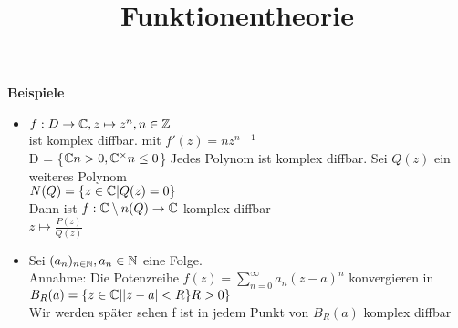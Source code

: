 \documentclass[11pt]{article}
\begin{document}
\title{Funktionentheorie}
\maketitle

\tableofcontents
\newpage






\textbf{Beispiele}
\begin{itemize}
	\item
	$f: D \to \mathbb{C}, z\mapsto z^n, n \in \mathbb{Z}  $\\
	ist komplex diffbar. mit $f\prime(z) = n z^{n-1}$\\
	D = \{$\mathbb{C} n > 0, \mathbb{C}^{\times} n \leq 0$\}
	Jedes Polynom ist komplex diffbar.
	Sei $Q(z)$ ein weiteres Polynom\\
	$N(Q) = \{z \in \mathbb{C}| Q(z)=0\}$\\
	Dann ist $f :\mathbb{C} \setminus n(Q) \to \mathbb{C}$ komplex diffbar\\
	$z \mapsto \frac{P(z)}{Q(z)}$
	\item
	Sei $(a_n)_{n \in \mathbb{N}}, a_n \in \mathbb{N}$ eine Folge.\\
	Annahme: Die Potenzreihe $f(z) = \sum^\infty_{n=0} a_n(z-a)^n$
	konvergieren in \\
	$B_{R}(a)=\{z \in \mathbb{C}| |z-a|<R\} R>0\}$ \\
	Wir werden später sehen f ist in jedem Punkt von $B_R(a)$ 
	komplex diffbar\\
\end{itemize}
\end{document}
